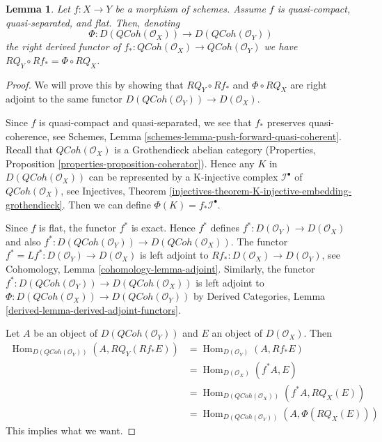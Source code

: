 \documentclass{stacks-project}
\theoremstyle{plain}
\newtheorem{lemma}[subsection]{Lemma}
\theoremstyle{definition}
\theoremstyle{remark}
\numberwithin{equation}{subsection}
\def\Hom{\mathop{\mathrm{Hom}}\nolimits}
\def\QCoh{\mathit{QCoh}}
\begin{document}
\begin{lemma}
\label{lemma-flat-pushforward-coherator}
Let $f : X \to Y$ be a morphism of schemes. Assume $f$ is
quasi-compact, quasi-separated, and flat. Then, denoting
$$
\Phi : D(\QCoh(\mathcal{O}_X)) \to D(\QCoh(\mathcal{O}_Y))
$$
the right derived functor of
$f_* : \QCoh(\mathcal{O}_X) \to \QCoh(\mathcal{O}_Y)$
we have $RQ_Y \circ Rf_* = \Phi \circ RQ_X$.
\end{lemma}

\begin{proof}
We will prove this by showing that $RQ_Y \circ Rf_*$ and $\Phi \circ RQ_X$
are right adjoint to the same functor
$D(\QCoh(\mathcal{O}_Y)) \to D(\mathcal{O}_X)$.

\medskip\noindent
Since $f$ is quasi-compact and quasi-separated, we see that
$f_*$ preserves quasi-coherence, see
Schemes, Lemma \ref{schemes-lemma-push-forward-quasi-coherent}.
Recall that $\QCoh(\mathcal{O}_X)$ is a Grothendieck abelian category
(Properties, Proposition \ref{properties-proposition-coherator}).
Hence any $K$ in $D(\QCoh(\mathcal{O}_X))$
can be represented by a K-injective complex $\mathcal{I}^\bullet$
of $\QCoh(\mathcal{O}_X)$, see
Injectives, Theorem
\ref{injectives-theorem-K-injective-embedding-grothendieck}.
Then we can define $\Phi(K) = f_*\mathcal{I}^\bullet$.

\medskip\noindent
Since $f$ is flat, the functor $f^*$ is exact. Hence $f^*$ defines
$f^* : D(\mathcal{O}_Y) \to D(\mathcal{O}_X)$ and also
$f^* : D(\QCoh(\mathcal{O}_Y)) \to D(\QCoh(\mathcal{O}_X))$.
The functor $f^* = Lf^* : D(\mathcal{O}_Y) \to D(\mathcal{O}_X)$
is left adjoint to
$Rf_* : D(\mathcal{O}_X) \to D(\mathcal{O}_Y)$,
see Cohomology, Lemma \ref{cohomology-lemma-adjoint}.
Similarly, the functor
$f^* : D(\QCoh(\mathcal{O}_Y)) \to D(\QCoh(\mathcal{O}_X))$
is left adjoint to
$\Phi : D(\QCoh(\mathcal{O}_X)) \to D(\QCoh(\mathcal{O}_Y))$
by Derived Categories, Lemma \ref{derived-lemma-derived-adjoint-functors}.

\medskip\noindent
Let $A$ be an object of $D(\QCoh(\mathcal{O}_Y))$ and
$E$ an object of $D(\mathcal{O}_X)$. Then
\begin{align*}
\Hom_{D(\QCoh(\mathcal{O}_Y))}(A, RQ_Y(Rf_*E))
& =
\Hom_{D(\mathcal{O}_Y)}(A, Rf_*E) \\
& =
\Hom_{D(\mathcal{O}_X)}(f^*A, E) \\
& =
\Hom_{D(\QCoh(\mathcal{O}_X))}(f^*A, RQ_X(E)) \\
& =
\Hom_{D(\QCoh(\mathcal{O}_Y))}(A, \Phi(RQ_X(E)))
\end{align*}
This implies what we want.
\end{proof}
\end{document}
